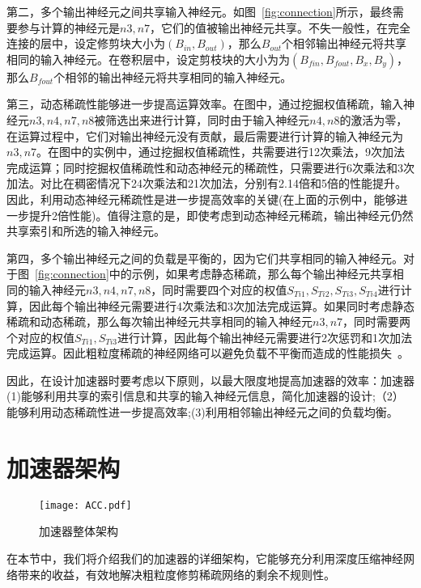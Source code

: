 第二，多个输出神经元之间共享输入神经元。如图~\ref{fig:connection}所示，最终需要参与计算的神经元是$n3, n7$，它们的值被输出神经元共享。不失一般性，在完全连接的层中，设定修剪块大小为$(B_{in},B_{out})$，那么$B_{out}$个相邻输出神经元将共享相同的输入神经元。在卷积层中，设定剪枝块的大小为为$(B_{fin},B_{fout},B_x,B_y)$，那么$B_{fout}$个相邻的输出神经元将共享相同的输入神经元。

第三，动态稀疏性能够进一步提高运算效率。在图中，通过挖掘权值稀疏，输入神经元$n3, n4, n7, n8$被筛选出来进行计算，同时由于输入神经元$n4, n8$的激活为零，在运算过程中，它们对输出神经元没有贡献，最后需要进行计算的输入神经元为$n3, n7$。在图中的实例中，通过挖掘权值稀疏性，共需要进行12次乘法，9次加法完成运算；同时挖掘权值稀疏性和动态神经元的稀疏性，只需要进行6次乘法和3次加法。对比在稠密情况下24次乘法和21次加法，分别有2.14倍和5倍的性能提升。因此，利用动态神经元稀疏性是进一步提高效率的关键(在上面的示例中，能够进一步提升2倍性能)。值得注意的是，即使考虑到动态神经元稀疏，输出神经元仍然共享索引和所选的输入神经元。

第四，多个输出神经元之间的负载是平衡的，因为它们共享相同的输入神经元。对于图~\ref{fig:connection}中的示例，如果考虑静态稀疏，那么每个输出神经元共享相同的输入神经元$n3, n4, n7, n8$，同时需要四个对应的权值$S_{Ti1}, S_{Ti2}, S_{Ti3}, S_{Ti4}$进行计算，因此每个输出神经元需要进行4次乘法和3次加法完成运算。如果同时考虑静态稀疏和动态稀疏，那么每次输出神经元共享相同的输入神经元$n3, n7$，同时需要两个对应的权值$S_{Ti1}, S_{Ti3}$进行计算，因此每个输出神经元需要进行2次惩罚和1次加法完成运算。因此粗粒度稀疏的神经网络可以避免负载不平衡而造成的性能损失~\cite{han2017ese}。

因此，在设计加速器时要考虑以下原则，以最大限度地提高加速器的效率：加速器(1)能够利用共享的索引信息和共享的输入神经元信息，简化加速器的设计;（2）能够利用动态稀疏性进一步提高效率;(3)利用相邻输出神经元之间的负载均衡。


\section{加速器架构}
\begin{figure}[h]
\centering
\texttt{[image: ACC.pdf]}
\caption{加速器整体架构}
\label{fig:acc}
\end{figure}

在本节中，我们将介绍我们的加速器的详细架构，它能够充分利用深度压缩神经网络带来的收益，有效地解决粗粒度修剪稀疏网络的剩余不规则性。

